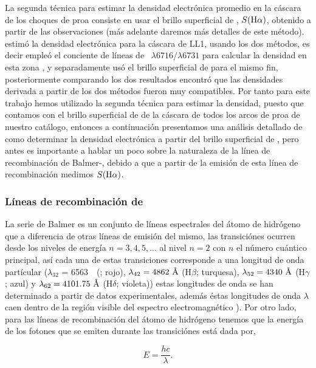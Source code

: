 La segunda técnica para estimar la densidad electrónica promedio en la cáscara de los choques de proa consiste en usar el brillo superficial de \ha{}, \(S(\mathrm{H}\alpha{})\), obtenido a partir de las observaciones (más adelante daremos más detalles de este método). \citet{Henney:2013a} estimó la densidad electrónica para la cáscara de LL1, usando los dos métodos, es decir empleó el conciente de líneas de \sii{}~\(\lambda 6716/\lambda 6731\) para calcular la densidad en esta zona , y separadamente usó el brillo superficial de \ha{} para el mismo fin, posteriormente comparando los dos resultados encontró que las densidades derivada a partir de los dos métodos fueron muy compatibles. Por tanto para este trabajo hemos utilizado la segunda técnica para estimar la densidad, puesto que contamos con el brillo superficial de \ha{} de la cáscara de todos los arcos de proa de nuestro catálogo, entonces a continuación presentamos una análisis detallado de como determinar la densidad electrónica a partir del brillo superficial de \ha{}, pero antes es importante a hablar un poco sobre la naturaleza de la línea de recombinación de Balmer-\ha{}, debido a que a partir de la emisión de esta línea de recombinación medimos \(S(\mathrm{H}\alpha{})\).    

\subsubsection{Líneas de recombinación de \ha{}}
\label{sec:lines-ha}

La serie de Balmer es un conjunto de líneas espectrales del átomo de hidrógeno que a diferencia de otras líneas de emisión del mismo, las transiciónes ocurren desde los niveles de energía \(n= 3,4,5,...\) al nivel \(n=2\) con \(n\) el número cuántico principal, así cada una de estas transiciones corresponde a una longitud de onda partícular (\(\lambda_{32}\) = 6563~\A~(\ha{}; rojo), \(\lambda_{42} = 4862~\text{\AA{}}{}\) (\(\mathrm{H}\beta\); turquesa), \(\lambda_{52} = 4340~\text{\AA{}}{}\) (\(\mathrm{H}\gamma\); azul) y \(\lambda_{62} = 4101.75~\text{\AA{}}{}\) (\(\mathrm{H}\delta\); violeta)) estas longitudes de onda se han determinado a partir de datos experimentales, además éstas longitudes de onda \(\lambda\) caen dentro de la región visible del espectro electromagnético \citep{Carroll:1996}). Por otro lado, para las líneas de recombinación del átomo de hidrógeno tenemos que la energía de los fotones que se emiten durante las transiciónes está dada por,

\begin{equation}
  \label{eq:energy}
  E = \frac{hc}{\lambda}. 
\end{equation}
 
